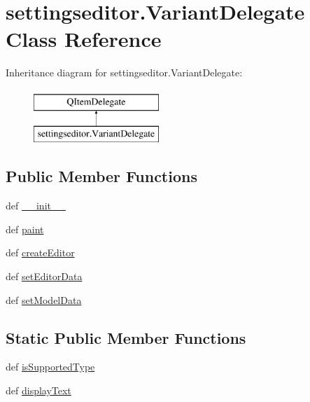 \hypertarget{classsettingseditor_1_1VariantDelegate}{}\section{settingseditor.\+Variant\+Delegate Class Reference}
\label{classsettingseditor_1_1VariantDelegate}
Inheritance diagram for settingseditor.\+Variant\+Delegate\+:\begin{figure}[H]
\begin{center}
\leavevmode
\includegraphics[height=2.000000cm]{classsettingseditor_1_1VariantDelegate}
\end{center}
\end{figure}
\subsection*{Public Member Functions}
\begin{DoxyCompactItemize}
\item 
def \hyperlink{classsettingseditor_1_1VariantDelegate_a045b1b6fcd2d5daf88e3f8cb16a41fcf}{\+\_\+\+\_\+init\+\_\+\+\_\+}
\item 
def \hyperlink{classsettingseditor_1_1VariantDelegate_a475f05182c4d8cef5aafc9e159ca9f32}{paint}
\item 
def \hyperlink{classsettingseditor_1_1VariantDelegate_a57b145dca68685240431d72700d15e41}{create\+Editor}
\item 
def \hyperlink{classsettingseditor_1_1VariantDelegate_aa7e9dc6bec6e78b6ada17af3167f9e41}{set\+Editor\+Data}
\item 
def \hyperlink{classsettingseditor_1_1VariantDelegate_af6dc79e241f038a3522b6230989dfa74}{set\+Model\+Data}
\end{DoxyCompactItemize}
\subsection*{Static Public Member Functions}
\begin{DoxyCompactItemize}
\item 
def \hyperlink{classsettingseditor_1_1VariantDelegate_a45d2d785493ec0d47df6a64fb13eaaef}{is\+Supported\+Type}
\item 
def \hyperlink{classsettingseditor_1_1VariantDelegate_a4a09ae363186425675890def053bd728}{display\+Text}
\end{DoxyCompactItemize}
